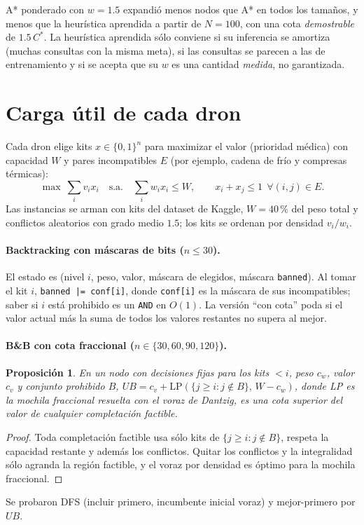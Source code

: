 \documentclass[11pt]{article}
\newtheorem{prop}{Proposición}
\theoremstyle{remark}
\begin{document}
A* ponderado con $w=1.5$ expandió menos nodos que A* en todos los tamaños, y menos que la heurística
aprendida a partir de $N=100$, con una cota \emph{demostrable} de $1.5\,C^*$. La heurística aprendida sólo conviene si su inferencia se amortiza (muchas consultas con la
misma meta), si las consultas se parecen a las de entrenamiento y si se acepta que su $w$ es una
cantidad \emph{medida}, no garantizada.

\section{Carga útil de cada dron}

Cada dron elige kits $x\in\{0,1\}^n$ para maximizar el valor (prioridad médica) con capacidad $W$ y
pares incompatibles $E$ (por ejemplo, cadena de frío y compresas térmicas):
\[
\max\ \textstyle\sum_i v_ix_i\quad\text{s.a.}\quad\sum_iw_ix_i\le W,\qquad x_i+x_j\le1\ \ \forall(i,j)\in E.
\]
Las instancias se arman con kits del dataset de Kaggle, $W=40\,\%$ del peso total y conflictos
aleatorios con grado medio $1.5$; los kits se ordenan por densidad $v_i/w_i$.

\paragraph{Backtracking con máscaras de bits ($n\le30$).} El estado es (nivel $i$, peso, valor,
máscara de elegidos, máscara \texttt{banned}). Al tomar el kit $i$,
\texttt{banned |= conf[i]}, donde \texttt{conf[i]} es la máscara de sus incompatibles; saber si $i$
está prohibido es un \texttt{AND} en $O(1)$. La versión ``con cota'' poda si el valor actual más la
suma de todos los valores restantes no supera al mejor.

\paragraph{B\&B con cota fraccional ($n\in\{30,60,90,120\}$).}
\begin{prop}
En un nodo con decisiones fijas para los kits $<i$, peso $c_w$, valor $c_v$ y conjunto prohibido $B$,
$UB=c_v+\mathrm{LP}(\{j\ge i: j\notin B\},\,W-c_w)$, donde LP es la mochila fraccional resuelta con el
voraz de Dantzig, es una cota superior del valor de cualquier completación factible.
\end{prop}
\begin{proof}
Toda completación factible usa sólo kits de $\{j\ge i:j\notin B\}$, respeta la capacidad restante y
además los conflictos. Quitar los conflictos y la integralidad sólo agranda la región factible, y el
voraz por densidad es óptimo para la mochila fraccional.
\end{proof}
Se probaron DFS (incluir primero, incumbente inicial voraz) y mejor-primero por $UB$.
\end{document}
